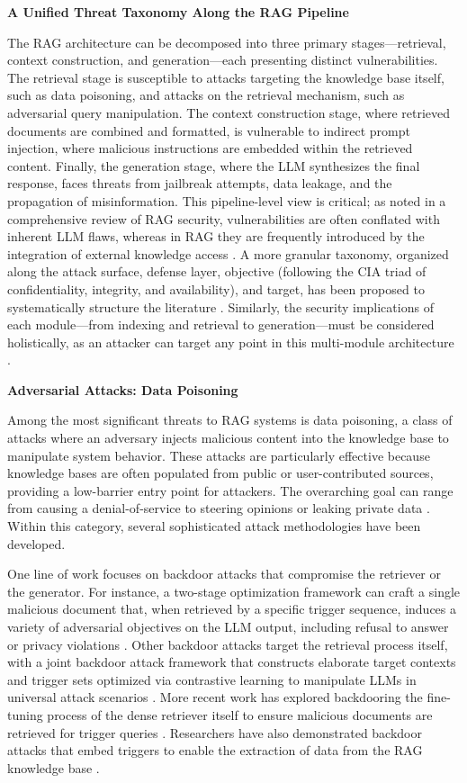 \documentclass[11pt]{article}
\begin{document}
\textbf{A Unified Threat Taxonomy Along the RAG Pipeline}

The RAG architecture can be decomposed into three primary stages---retrieval, context construction, and generation---each presenting distinct vulnerabilities. The retrieval stage is susceptible to attacks targeting the knowledge base itself, such as data poisoning, and attacks on the retrieval mechanism, such as adversarial query manipulation. The context construction stage, where retrieved documents are combined and formatted, is vulnerable to indirect prompt injection, where malicious instructions are embedded within the retrieved content. Finally, the generation stage, where the LLM synthesizes the final response, faces threats from jailbreak attempts, data leakage, and the propagation of misinformation. This pipeline-level view is critical; as noted in a comprehensive review of RAG security, vulnerabilities are often conflated with inherent LLM flaws, whereas in RAG they are frequently introduced by the integration of external knowledge access \cite{ref423}. A more granular taxonomy, organized along the attack surface, defense layer, objective (following the CIA triad of confidentiality, integrity, and availability), and target, has been proposed to systematically structure the literature \cite{ref423}. Similarly, the security implications of each module---from indexing and retrieval to generation---must be considered holistically, as an attacker can target any point in this multi-module architecture \cite{ref75,ref68}.

\textbf{Adversarial Attacks: Data Poisoning}

Among the most significant threats to RAG systems is data poisoning, a class of attacks where an adversary injects malicious content into the knowledge base to manipulate system behavior. These attacks are particularly effective because knowledge bases are often populated from public or user-contributed sources, providing a low-barrier entry point for attackers. The overarching goal can range from causing a denial-of-service to steering opinions or leaking private data \cite{ref458,ref459}. Within this category, several sophisticated attack methodologies have been developed.

One line of work focuses on backdoor attacks that compromise the retriever or the generator. For instance, a two-stage optimization framework can craft a single malicious document that, when retrieved by a specific trigger sequence, induces a variety of adversarial objectives on the LLM output, including refusal to answer or privacy violations \cite{ref460}. Other backdoor attacks target the retrieval process itself, with a joint backdoor attack framework that constructs elaborate target contexts and trigger sets optimized via contrastive learning to manipulate LLMs in universal attack scenarios \cite{ref461}. More recent work has explored backdooring the fine-tuning process of the dense retriever itself to ensure malicious documents are retrieved for trigger queries \cite{ref462}. Researchers have also demonstrated backdoor attacks that embed triggers to enable the extraction of data from the RAG knowledge base \cite{ref463}.
\end{document}

